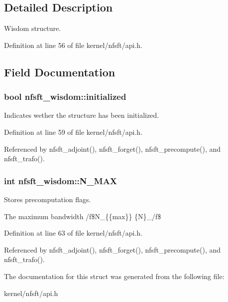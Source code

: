 \subsection{Detailed Description}
Wisdom structure. 

Definition at line 56 of file kernel/nfsft/api.\-h.



\subsection{Field Documentation}
\hypertarget{structnfsft__wisdom_abb3162b2e1faa123a9ef70f1374aa740}{
\subsubsection[{initialized}]{\setlength{\rightskip}{0pt plus 5cm}bool nfsft\-\_\-wisdom\-::initialized}}\label{structnfsft__wisdom_abb3162b2e1faa123a9ef70f1374aa740}


Indicates wether the structure has been initialized. 



Definition at line 59 of file kernel/nfsft/api.\-h.



Referenced by nfsft\-\_\-adjoint(), nfsft\-\_\-forget(), nfsft\-\_\-precompute(), and nfsft\-\_\-trafo().

\hypertarget{structnfsft__wisdom_ac0d21110fe9475646b8174b1048cda51}{
\subsubsection[{N\-\_\-\-M\-A\-X}]{\setlength{\rightskip}{0pt plus 5cm}int nfsft\-\_\-wisdom\-::\-N\-\_\-\-M\-A\-X}}\label{structnfsft__wisdom_ac0d21110fe9475646b8174b1048cda51}


Stores precomputation flags. 

The maximum bandwidth /f\$\-N\-\_\-\{\{max\}\}  \{N\}\-\_/f\$ 

Definition at line 63 of file kernel/nfsft/api.\-h.



Referenced by nfsft\-\_\-adjoint(), nfsft\-\_\-forget(), nfsft\-\_\-precompute(), and nfsft\-\_\-trafo().



The documentation for this struct was generated from the following file\-:\begin{DoxyCompactItemize}
\item 
kernel/nfsft/api.\-h\end{DoxyCompactItemize}
